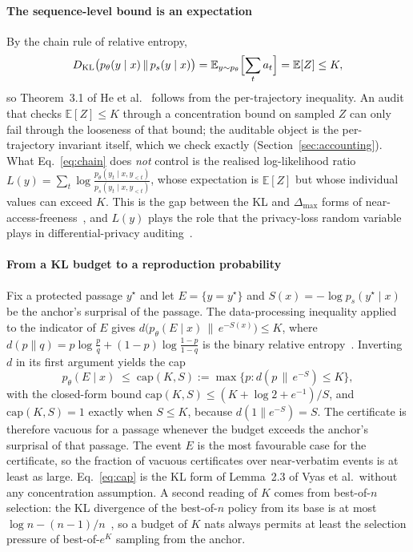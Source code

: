 \paragraph{The sequence-level bound is an expectation}
By the chain rule of relative entropy,
\begin{equation}
D_{\mathrm{KL}}\bigl(p_\theta(y \mid x)\,\|\,p_s(y \mid x)\bigr) = \mathbb{E}_{y \sim p_\theta}\Bigl[\sum_{t} a_t\Bigr] = \mathbb{E}[Z] \le K,
\label{eq:chain}
\end{equation}
so Theorem~3.1 of He et al.~\cite{he2026anchored} follows from the per-trajectory inequality. An audit that checks $\mathbb{E}[Z] \le K$ through a concentration bound on sampled $Z$ can only fail through the looseness of that bound; the auditable object is the per-trajectory invariant itself, which we check exactly (Section~\ref{sec:accounting}). What Eq.~\eqref{eq:chain} does \emph{not} control is the realised log-likelihood ratio $L(y) = \sum_t \log \tfrac{p_\theta(y_t \mid x, y_{<t})}{p_s(y_t \mid x, y_{<t})}$, whose expectation is $\mathbb{E}[Z]$ but whose individual values can exceed $K$. This is the gap between the KL and $\Delta_{\max}$ forms of near-access-freeness~\cite{vyas2023provable}, and $L(y)$ plays the role that the privacy-loss random variable plays in differential-privacy auditing~\cite{dwork2014algorithmic,nasr2023tight}.

\paragraph{From a KL budget to a reproduction probability}
Fix a protected passage $y^\star$ and let $E = \{y = y^\star\}$ and $S(x) = -\log p_s(y^\star \mid x)$ be the anchor's surprisal of the passage. The data-processing inequality applied to the indicator of $E$ gives $d\bigl(p_\theta(E \mid x)\,\|\,e^{-S(x)}\bigr) \le K$, where $d(p \| q) = p \log\tfrac{p}{q} + (1-p)\log\tfrac{1-p}{1-q}$ is the binary relative entropy~\cite{polyanskiy2024information}. Inverting $d$ in its first argument yields the cap
\begin{equation}
p_\theta(E \mid x) \;\le\; \mathrm{cap}(K, S) := \max\{p : d(p \,\|\, e^{-S}) \le K\},
\label{eq:cap}
\end{equation}
with the closed-form bound $\mathrm{cap}(K,S) \le (K + \log 2 + e^{-1})/S$, and $\mathrm{cap}(K,S) = 1$ exactly when $S \le K$, because $d(1 \| e^{-S}) = S$. The certificate is therefore vacuous for a passage whenever the budget exceeds the anchor's surprisal of that passage. The event $E$ is the most favourable case for the certificate, so the fraction of vacuous certificates over near-verbatim events is at least as large. Eq.~\eqref{eq:cap} is the KL form of Lemma~2.3 of Vyas et al.\ without any concentration assumption. A second reading of $K$ comes from best-of-$n$ selection: the KL divergence of the best-of-$n$ policy from its base is at most $\log n - (n-1)/n$~\cite{beirami2025bestofn}, so a budget of $K$ nats always permits at least the selection pressure of best-of-$e^{K}$ sampling from the anchor.

